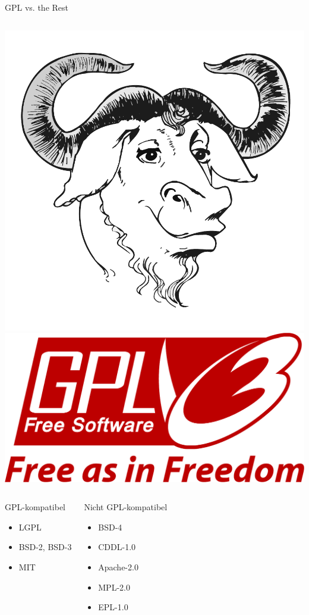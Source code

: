 \documentclass[pdflatex, ngerman]{beamer}
\begin{document}
\begin{frame}{GPL vs. the Rest}
\begin{columns}
\centering\includegraphics[width=0.5\columnwidth]{Official_gnu}
\centering\includegraphics[width=0.5\columnwidth]{GPLv3_Logo}
\end{columns}
\begin{columns}
\begin{block}{GPL-kompatibel}
  \begin{itemize}
    \item LGPL
    \item BSD-2, BSD-3
    \item MIT
  \end{itemize}
\end{block}
\begin{block}{Nicht GPL-kompatibel}
  \begin{itemize}
    \item BSD-4
    \item CDDL-1.0
    \item Apache-2.0
    \item MPL-2.0
    \item EPL-1.0
  \end{itemize}
\end{block}
\end{columns}
\end{frame}

\end{document}
